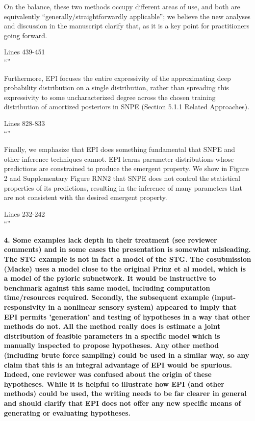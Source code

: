 \documentclass[11pt,a4paper]{article}
\begin{document}
On the balance, these two methods occupy different areas of use, and both are equivalently ``generally/straightforwardly applicable''; we believe the new analyses and discussion in the manuscript clarify that, as it is a key point for practitioners going forward.   

\begin{displayquote}
Lines 439-451\\
``''
\end{displayquote}

Furthermore, EPI focuses the entire expressivity of the approximating deep probability distribution on a single distribution, rather than spreading this expressivity to some uncharacterized degree across the chosen training distribution of amortized posteriors in SNPE (Section 5.1.1 Related Approaches).

\begin{displayquote}
Lines 828-833\\
``''
\end{displayquote}
 
Finally, we emphasize that EPI does something fundamental that SNPE and other inference techniques cannot.  EPI learns parameter distributions whose predictions are constrained to produce the emergent property.  We show in Figure 2 and Supplementary Figure RNN2 that SNPE does not control the statistical properties of its predictions, resulting in the inference of many parameters that are not consistent with the desired emergent property.

\begin{displayquote}
Lines 232-242\\
``''
\end{displayquote}

\textbf{4. Some examples lack depth in their treatment (see reviewer comments) and in some cases the presentation is somewhat misleading. The STG example is not in fact a model of the STG. The cosubmission (Macke) uses a model close to the original Prinz et al model, which is a model of the pyloric subnetwork. It would be instructive to benchmark against this same model, including computation time/resources required. Secondly, the subsequent example (input-responsivity in a nonlinear sensory system) appeared to imply that EPI permits 'generation' and testing of hypotheses in a way that other methods do not. All the method really does is estimate a joint distribution of feasible parameters in a specific model which is manually inspected to propose hypotheses. Any other method (including brute force sampling) could be used in a similar way, so any claim that this is an integral advantage of EPI would be spurious. Indeed, one reviewer was confused about the origin of these hypotheses. While it is helpful to illustrate how EPI (and other methods) could be used, the writing needs to be far clearer in general and should clarify that EPI does not offer any new specific means of generating or evaluating hypotheses.}
\end{document}
